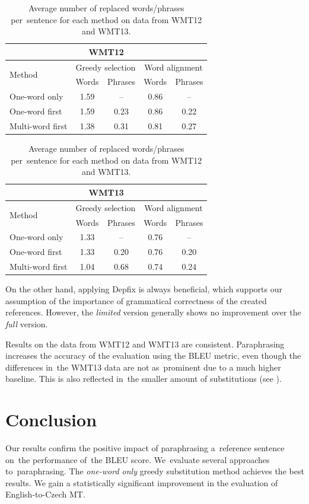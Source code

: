 \begin{table}[htb]
\begin{center}
\begin{tabular}{l|cc|cc}
\multicolumn{5}{c}{\textbf{WMT12}}\\
\hline
\multirow{2}{*}{Method} & \multicolumn{2}{c|}{Greedy selection} & \multicolumn{2}{c}{Word alignment} \\
& Words & Phrases & Words & Phrases \\
\hline
One-word only     & 1.59 & --   & 0.86 &  --  \\
One-word first    & 1.59 & 0.23 & 0.86 & 0.22 \\
Multi-word first  & 1.38 & 0.31 & 0.81 & 0.27 \\
\end{tabular}
\vspace{10pt}
\begin{tabular}{l|cc|cc}
\multicolumn{5}{c}{\textbf{WMT13}}\\
\hline
\multirow{2}{*}{Method} & \multicolumn{2}{c|}{Greedy selection} & \multicolumn{2}{c}{Word alignment} \\
& Words & Phrases & Words & Phrases \\
\hline
One-word only    & 1.33 &  --  & 0.76 & --   \\
One-word first   & 1.33 & 0.20 & 0.76 & 0.20 \\
Multi-word first & 1.04 & 0.68 & 0.74 & 0.24 \\
\end{tabular}

\caption{Average number of replaced words/phrases per~sentence for each method 
on data from WMT12 and WMT13.}
\label{substitutions:12:13}
\end{center}
\end{table}

On the other hand, applying Depfix is always beneficial, which supports our
 assumption of the importance of grammatical correctness of the created
references. However, the \textit{limited} version generally shows no 
improvement over the \textit{full} version.

Results on the data from WMT12 and WMT13 are consistent. 
Paraphrasing increases the accuracy of the evaluation using the BLEU metric, even though the differences in~the WMT13 data are not as~prominent due to a much higher baseline.
This is also reflected in~the smaller amount of substitutions (see ).

\section{Conclusion}
Our results confirm the positive impact of paraphrasing a~reference sentence on~the performance of~the BLEU score.
We~evaluate several approaches to~paraphrasing. 
The \textit{one-word only} greedy substitution method achieves the best results. 
We gain a statistically significant improvement in the evaluation of English-to-Czech MT. 

